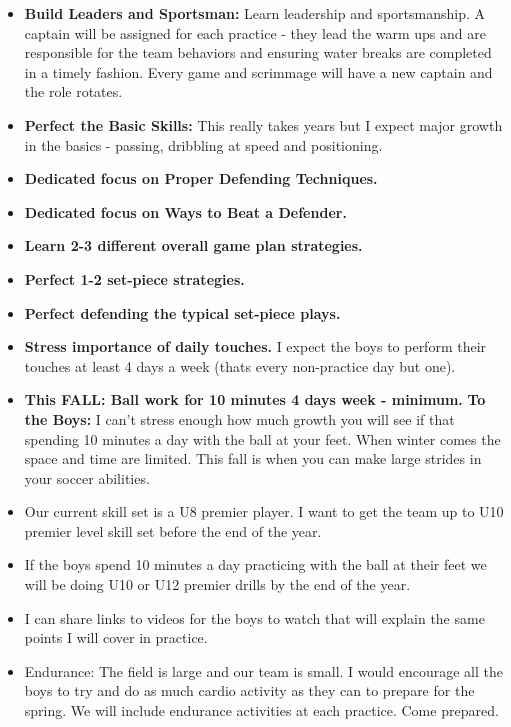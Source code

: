 \documentclass[10pt,letterpaper]{article}
\newenvironment{agendablock}[1]{%
    \tcolorbox[beamer,%
    noparskip,breakable,
    colback=LightGray,colframe=Black,%
    colbacklower=Gray!75!LightGray,%
    title=#1]}%
    {\endtcolorbox}
\begin{document}
\clearpage

\begin{agendablock}{Goals for this year:}
    \begin{itemize}
        \item \textbf{Build Leaders and Sportsman:}  Learn leadership and sportsmanship.  A captain will be assigned for each practice - they lead the warm ups and are responsible for the team behaviors and ensuring water breaks are completed in a timely fashion.  Every game and scrimmage will have a new captain and the role rotates.
        \item \textbf{Perfect the Basic Skills:}  This really takes years but I expect major growth in the basics - passing, dribbling at speed and positioning.
        \item \textbf{Dedicated focus on Proper Defending Techniques.}
         \item \textbf{Dedicated focus on Ways to Beat a Defender.}
        \item \textbf{Learn 2-3 different overall game plan strategies.}
        \item \textbf{Perfect 1-2 set-piece strategies.}
        \item \textbf{Perfect defending the typical set-piece plays.}
    \end{itemize}
\end{agendablock}

\begin{agendablock}{Player Work Outside of Practice}
    \begin{itemize}
        \item \textbf{Stress importance of daily touches.}  I expect the boys to perform their touches at least 4 days a week (thats every non-practice day but one).
        \item \textbf{This FALL: Ball work for 10 minutes 4 days week - minimum.}  \textbf{To the Boys:} I can't stress enough how much growth you will see if that spending 10 minutes a day with the ball at your feet.  When winter comes the space and time are limited.  This fall is when you can make large strides in your soccer abilities.
        \item Our current skill set is a U8 premier player.  I want to get the team up to U10 premier level skill set before the end of the year.
        \item If the boys spend 10 minutes a day practicing with the ball at their feet we will be doing U10 or U12 premier drills by the end of the year.
        \item I can share links to videos for the boys to watch that will explain the same points I will cover in practice.
        \item Endurance: The field is large and our team is small.  I would encourage all the boys to try and do as much cardio activity as they can to prepare for the spring.  We will include endurance activities at each practice.  Come prepared.
    \end{itemize}
\end{agendablock}
\end{document}
